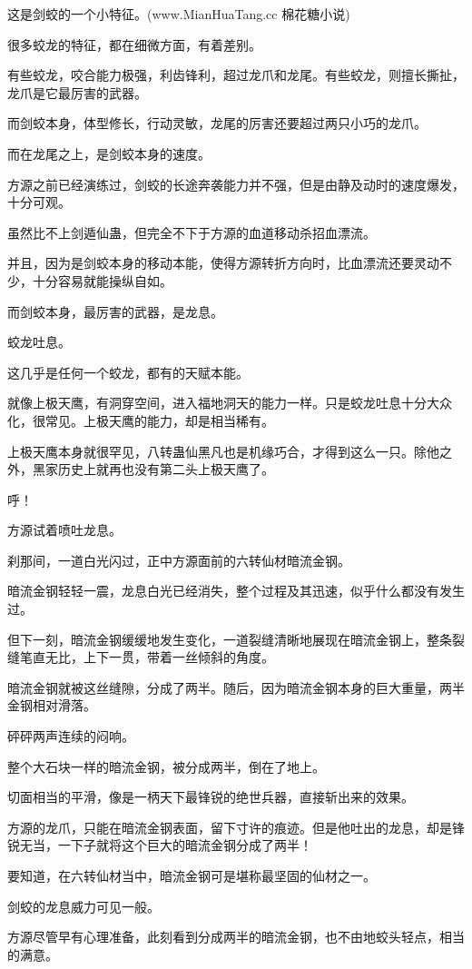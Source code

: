 \begin{this_body}
这是剑蛟的一个小特征。(www.MianHuaTang.cc 棉花糖小说)

很多蛟龙的特征，都在细微方面，有着差别。

有些蛟龙，咬合能力极强，利齿锋利，超过龙爪和龙尾。有些蛟龙，则擅长撕扯，龙爪是它最厉害的武器。

而剑蛟本身，体型修长，行动灵敏，龙尾的厉害还要超过两只小巧的龙爪。

而在龙尾之上，是剑蛟本身的速度。

方源之前已经演练过，剑蛟的长途奔袭能力并不强，但是由静及动时的速度爆发，十分可观。

虽然比不上剑遁仙蛊，但完全不下于方源的血道移动杀招血漂流。

并且，因为是剑蛟本身的移动本能，使得方源转折方向时，比血漂流还要灵动不少，十分容易就能操纵自如。

而剑蛟本身，最厉害的武器，是龙息。

蛟龙吐息。

这几乎是任何一个蛟龙，都有的天赋本能。

就像上极天鹰，有洞穿空间，进入福地洞天的能力一样。只是蛟龙吐息十分大众化，很常见。上极天鹰的能力，却是相当稀有。

上极天鹰本身就很罕见，八转蛊仙黑凡也是机缘巧合，才得到这么一只。除他之外，黑家历史上就再也没有第二头上极天鹰了。

呼！

方源试着喷吐龙息。

刹那间，一道白光闪过，正中方源面前的六转仙材暗流金钢。

暗流金钢轻轻一震，龙息白光已经消失，整个过程及其迅速，似乎什么都没有发生过。

但下一刻，暗流金钢缓缓地发生变化，一道裂缝清晰地展现在暗流金钢上，整条裂缝笔直无比，上下一贯，带着一丝倾斜的角度。

暗流金钢就被这丝缝隙，分成了两半。随后，因为暗流金钢本身的巨大重量，两半金钢相对滑落。

砰砰两声连续的闷响。

整个大石块一样的暗流金钢，被分成两半，倒在了地上。

切面相当的平滑，像是一柄天下最锋锐的绝世兵器，直接斩出来的效果。

方源的龙爪，只能在暗流金钢表面，留下寸许的痕迹。但是他吐出的龙息，却是锋锐无当，一下子就将这个巨大的暗流金钢分成了两半！

要知道，在六转仙材当中，暗流金钢可是堪称最坚固的仙材之一。

剑蛟的龙息威力可见一般。

方源尽管早有心理准备，此刻看到分成两半的暗流金钢，也不由地蛟头轻点，相当的满意。


\end{this_body}
